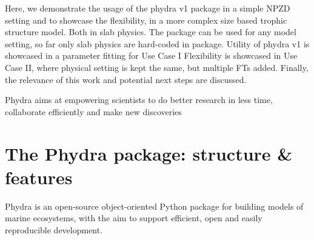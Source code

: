 \documentclass[journal abbreviations, manuscript]{copernicus}
\begin{document}
Here, we demonstrate the usage of the phydra v1 package in a simple NPZD setting and to showcase the flexibility, in a more complex size based trophic structure model. Both in slab physics.
The package can be used for any model setting, so far only slab physics are hard-coded in package.
Utility of phydra v1 is showcased in a parameter fitting for Use Case I
Flexibility is showcased in Use Case II, where physical setting is kept the same, but multiple FTs added.
Finally, the relevance of this work and potential next steps are discussed.



Phydra aims at empowering scientists to do better research in less time, collaborate efficiently and make new discoveries















\clearpage

\section{The Phydra package: structure \& features} \label{Section:phydrapackage}

Phydra is an open-source object-oriented Python package for building models of marine ecosystems, with the aim to support efficient, open and easily reproducible development. 
\end{document}
